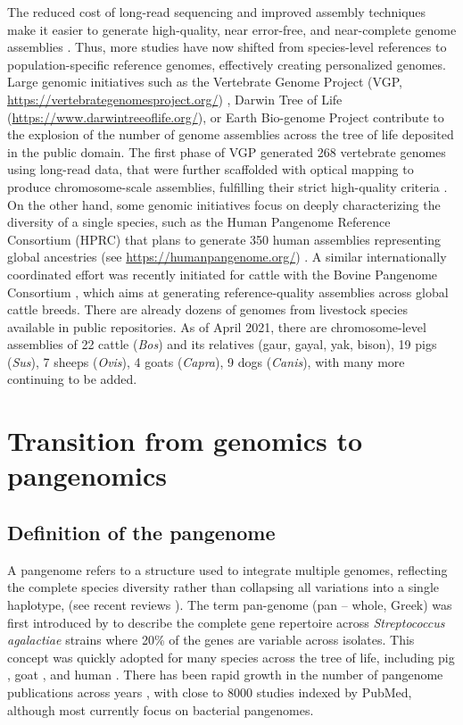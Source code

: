 \documentclass[../main.tex]{subfiles}
\begin{document}
The reduced cost of long-read sequencing and improved assembly techniques  make it easier to generate high-quality, near error-free, and near-complete genome assemblies \citep{miga2020telomere,logsdon2021structure}. Thus, more studies have now shifted from species-level references to population-specific reference genomes, effectively creating personalized genomes. Large genomic initiatives such as the Vertebrate Genome Project (VGP, \url{https://vertebrategenomesproject.org/}) \citep{Rhie2021}, Darwin Tree of Life (\url{https://www.darwintreeoflife.org/}), or Earth Bio-genome Project \citep{lewin2018earth} contribute to the explosion of the number of genome assemblies across the tree of life deposited in the public domain. The first phase of VGP generated 268 vertebrate genomes using long-read data, that were further scaffolded with optical mapping to produce chromosome-scale assemblies, fulfilling their strict high-quality criteria \citep{Rhie2021}. On the other hand, some genomic initiatives focus on deeply characterizing the diversity of a single species, such as the Human Pangenome Reference Consortium (HPRC) that plans to generate 350 human assemblies representing global ancestries (see \url{https://humanpangenome.org/}) \citep{miga2021need}. A similar internationally coordinated effort was recently initiated for cattle with the Bovine Pangenome Consortium \citep{heaton2021reference}, which aims at generating reference-quality assemblies across global cattle breeds. There are already dozens of genomes from livestock species available in public repositories. As of April 2021, there are chromosome-level assemblies of 22 cattle (\emph{Bos}) and its relatives (gaur, gayal, yak, bison), 19 pigs (\emph{Sus}), 7 sheeps (\emph{Ovis}), 4 goats (\emph{Capra}), 9 dogs (\emph{Canis}), with many more continuing to be added.

\section{Transition from genomics to pangenomics}

\subsection*{Definition of the pangenome}

A pangenome refers to a structure used to  integrate multiple genomes, reflecting the complete species diversity rather than collapsing all variations into a single haplotype, (see recent reviews \citep{bayer2020plant,sherman2020pan,della2021pan}). The term pan-genome (pan – whole, Greek) was first introduced by \citet{tettelin2005genome} to describe the complete gene repertoire across \emph{Streptococcus agalactiae} strains where 20\% of the genes are variable across isolates. This concept was quickly adopted for many species across the tree of life, including pig \citep{li2017comprehensive,tian2019building}, goat \citep{li2019towards}, and human \citep{duan2019hupan,sherman2019assembly}. There has been rapid growth in the number of pangenome publications across years \citep{bayer2020plant}, with close to 8000 studies indexed by PubMed,  although most currently focus on bacterial pangenomes.  
\end{document}

